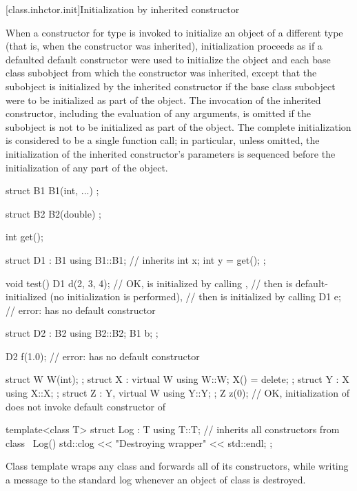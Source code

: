[class.inhctor.init]{Initialization by inherited constructor}%

\pnum
When a constructor for type  is invoked
to initialize an object of a different type 
(that is, when the constructor was inherited),
initialization proceeds as if a defaulted default constructor
were used to initialize the  object and
each base class subobject from which the constructor was inherited,
except that the  subobject is initialized
by the inherited constructor
if the base class subobject were to be initialized
as part of the  object.
The invocation of the inherited constructor,
including the evaluation of any arguments,
is omitted if the  subobject is not to be initialized
as part of the  object.
The complete initialization is considered to be a single function call;
in particular, unless omitted,
the initialization of the inherited constructor's parameters
is sequenced before the initialization of any part of the  object.
\begin{example}
\begin{codeblock}
struct B1 {
  B1(int, ...) { }
};

struct B2 {
  B2(double) { }
};

int get();

struct D1 : B1 {
  using B1::B1;     // inherits 
  int x;
  int y = get();
};

void test() {
  D1 d(2, 3, 4);    // OK,  is initialized by calling ,
                    // then  is default-initialized (no initialization is performed),
                    // then  is initialized by calling 
  D1 e;             // error:  has no default constructor
}

struct D2 : B2 {
  using B2::B2;
  B1 b;
};

D2 f(1.0);          // error:  has no default constructor

struct W { W(int); };
struct X : virtual W { using W::W; X() = delete; };
struct Y : X { using X::X; };
struct Z : Y, virtual W { using Y::Y; };
Z z(0);             // OK, initialization of  does not invoke default constructor of 

template<class T> struct Log : T {
  using T::T;       // inherits all constructors from class 
  ~Log() { std::clog << "Destroying wrapper" << std::endl; }
};
\end{codeblock}
Class template  wraps any class and forwards all of its constructors,
while writing a message to the standard log
whenever an object of class  is destroyed.
\end{example}

